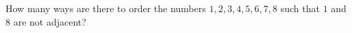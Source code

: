 How many ways are there to order the numbers $1,2,3,4,5,6,7,8$ such that $1$ and $8$ are not adjacent?
